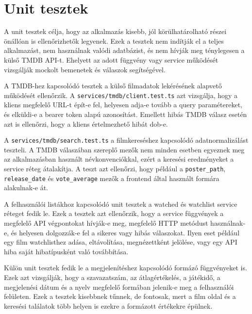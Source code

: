 \section{Unit tesztek}

A unit tesztek célja, hogy az alkalmazás kisebb, jól körülhatárolható részei önállóan is ellenőrizhetők legyenek. Ezek a tesztek nem indítják el a teljes alkalmazást, nem használnak valódi adatbázist, és nem hívják meg ténylegesen a külső TMDB API-t. Ehelyett az adott függvény vagy service működését vizsgálják mockolt bemenetek és válaszok segítségével.

A TMDB-hez kapcsolódó tesztek a külső filmadatok lekérésének alapvető működését ellenőrzik. A \texttt{services/tmdb/client.test.ts} azt vizsgálja, hogy a kliens megfelelő URL-t épít-e fel, helyesen adja-e tovább a query paramétereket, és elküldi-e a bearer token alapú azonosítást. Emellett hibás TMDB válasz esetén azt is ellenőrzi, hogy a kliens értelmezhető hibát dob-e.

A \texttt{services/tmdb/search.test.ts} a filmkereséshez kapcsolódó adatnormalizálást teszteli. A TMDB válaszában szereplő mezők nem minden esetben egyeznek meg az alkalmazásban használt névkonvenciókkal, ezért a keresési eredményeket a service réteg átalakítja. A teszt azt ellenőrzi, hogy például a \texttt{poster\_path}, \texttt{release\_date} és \texttt{vote\_average} mezők a frontend által használt formára alakulnak-e át.

A felhasználói listákhoz kapcsolódó unit tesztek a watched és watchlist service réteget fedik le. Ezek a tesztek azt ellenőrzik, hogy a service függvények a megfelelő API végpontokat hívják-e meg, megfelelő HTTP metódust használnak-e, és helyesen dolgozzák-e fel a sikeres vagy hibás válaszokat. Ilyen eset például egy film watchlisthez adása, eltávolítása, megnézettként jelölése, vagy egy API hiba saját hibatípusként való továbbítása.

Külön unit tesztek fedik le a megjelenítéshez kapcsolódó formázó függvényeket is. Ezek azt vizsgálják, hogy a szavazatszám, az átlagértékelés, a játékidő, a megjelenési dátum és a nyelv megfelelő formában jelenik-e meg a felhasználói felületen. Ezek a tesztek kisebbnek tűnnek, de fontosak, mert a film oldal és a keresési találatok több helyen is ezekre a formázott értékekre épülnek.